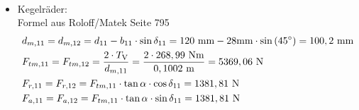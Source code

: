 \begin{itemize}
\begin{align*}
\end{align*}
\item Kegelräder:\\
Formel aus Roloff/Matek Seite 795 
\begin{align*}
	&d_{m,11} = d_{m,12}= d_{11} - b_{11} \cdot \sin{\delta_{11}} = 120 \text{ mm} - 28\text{mm} \cdot \sin{(45^\circ)} = 100,2 \text{ mm}\\ 
	&F_{tm,11} = F_{tm,12}= \frac{2 \cdot T_{\mathrm{V}}}{d_{m,11}} = \frac{2 \cdot 268,99 \text{ Nm} } {0,1002 \text{ m}} = 5369,06 \text{ N}\\
	&F_{r,11} = F_{r,12} = F_{tm,11} \cdot \tan{\alpha} \cdot \cos{\delta_{11}} =1381,81 \text{ N}\\ 
	&F_{a,11} = F_{a,12} =F_{tm,11}\cdot \tan{\alpha} \cdot \sin{\delta_{11}} = 1381,81 \text{ N} \\ 
\end{align*}
\end{itemize}